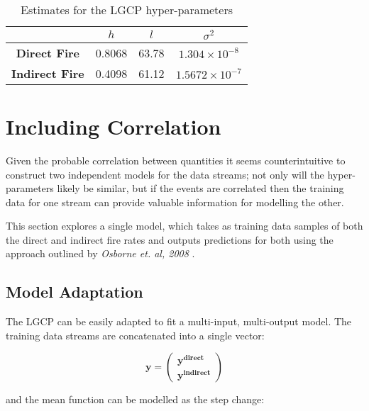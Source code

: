 \documentclass[a4paper,11pt]{report}
\begin{document}
\singlespacing
\begin{table}[]
\centering
\caption{Estimates for the LGCP hyper-parameters}
\label{LGCPhyperparameters}
\begin{tabular}{c|c|c|c|}
\cline{2-4}
\textbf{}                                    & \(h\) & \(l\) & \(\sigma^2\) \\ \hline
\multicolumn{1}{|c|}{\textbf{Direct Fire}}   & 0.8068          & 63.78          & \(1.304\times 10^{-8}\)              \\ \hline
\multicolumn{1}{|c|}{\textbf{Indirect Fire}} & 0.4098          & 61.12          & \(1.5672\times 10^{-7}\)              \\ \hline
\end{tabular}
\end{table}
\doublespacing

\section{Including Correlation}

Given the probable correlation between quantities it seems counterintuitive to construct two independent models for the data streams; not only will the hyper-parameters likely be similar, but if the events are correlated then the training data for one stream can provide valuable information for modelling the other.\par

This section explores a single model, which takes as training data samples of both the direct and indirect fire rates and outputs predictions for both using the approach outlined by \textit{Osborne et. al, 2008} \cite{multi-outputGP}.

\subsection{Model Adaptation}

The LGCP can be easily adapted to fit a multi-input, multi-output model. The training data streams are concatenated into a single vector:

\begin{equation} \label{eq:LGCPCy}
\mathbf{y} = \left( \begin{array}{cc}
\mathbf{y^{direct}} \\
\mathbf{y^{indirect}} \end{array} \right)
\end{equation}

and the mean function can be modelled as the step change: 
\end{document}
